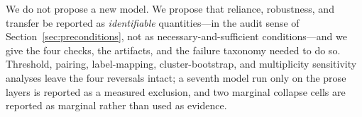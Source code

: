 We do not propose a new model. We propose that reliance, robustness, and transfer be reported as \emph{identifiable} quantities---in the audit sense of Section~\ref{sec:preconditions}, not as necessary-and-sufficient conditions---and we give the four checks, the artifacts, and the failure taxonomy needed to do so. Threshold, pairing, label-mapping, cluster-bootstrap, and multiplicity sensitivity analyses leave the four reversals intact; a seventh model run only on the prose layers is reported as a measured exclusion, and two marginal collapse cells are reported as marginal rather than used as evidence.
